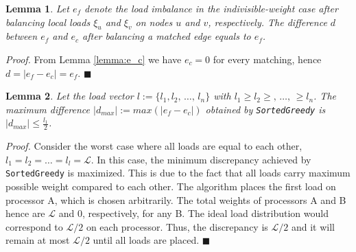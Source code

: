 \documentclass[12pt,psfig,a4]{article}
\newcommand{\sg}{\texttt{SortedGreedy}}
\newtheorem{mylemma}{Lemma}
\theoremstyle{plain}
\begin{document}
\begin{mylemma}
\label{lemma:d}
Let $e_f$ denote the load imbalance in the indivisible-weight case after balancing local loads $\xi_u$ and $\xi_v$ on nodes $u$ and $v$, respectively. The difference $d$ between $e_f$ and $e_c$ after balancing a matched edge equals to $e_f$.
\end{mylemma}

\textit{Proof.} From Lemma \ref{lemma:e_c} we have $e_c=0$ for every matching, hence $d=|e_f - e_c|= e_f$. $\blacksquare$

\begin{mylemma} 
\label{lemma:proof}
Let the load vector $l:=\{l_1,l_2,\,\ldots,\,l_n\}$ with $l_1\geq l_2 \geq,\,\ldots,\,\geq l_n$. The maximum difference $|d_{max}|:=max(|e_f - e_c|)$ obtained by \sg{} is $\left | d_{max} \right | \leq \frac{l_1}{2}$. 
\end{mylemma}

\textit{Proof.} Consider the worst case where all loads are equal to each other, $l_1=l_2=\ldots=l_l=\mathcal{L}$. In this case, the minimum discrepancy achieved by \sg{} is maximized. This is due to the fact that all loads carry maximum possible weight compared to each other. The algorithm places the first load on processor A, which is chosen arbitrarily. The total weights of processors A and B hence are $\mathcal{L}$ and $0$, respectively, for any B. The ideal load distribution would correspond to $\mathcal{L}/2$ on each processor. Thus, the discrepancy is $\mathcal{L}/2$ and it will remain at most $\mathcal{L}/2$ until all loads are placed. $\blacksquare$ 
\end{document}
